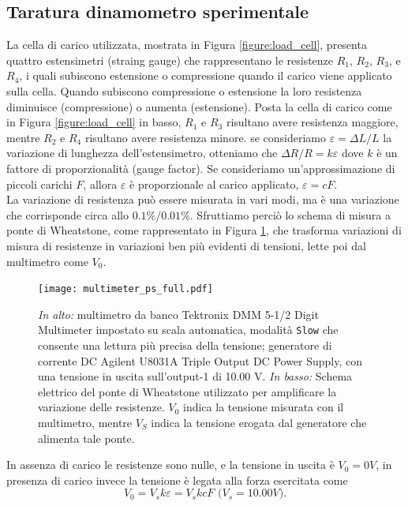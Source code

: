 \documentclass[italian, a4paper, 10pt, twocolumn]{../../style/lab_unige}
\newcommand{\reffig}[1]{Figura {\ref{#1}}}%
\begin{document}
    \subsection{Taratura dinamometro sperimentale}

    La cella di carico utilizzata, mostrata in \reffig{figure:load_cell}, presenta quattro estensimetri (straing gauge) che rappresentano le resistenze $R_1$, $R_2$, $R_3$, e $R_4$, i quali subiscono estensione o compressione quando il carico viene applicato sulla cella. Quando subiscono compressione o estensione la loro resistenza diminuisce (compressione) o aumenta (estensione). Posta la cella di carico come in \reffig{figure:load_cell} in basso, $R_1$ e $R_3$ risultano avere resistenza maggiore, mentre $R_2$ e $R_4$ risultano avere resistenza minore. se consideriamo $\varepsilon=\Delta L/L$ la variazione di lunghezza dell'estensimetro, otteniamo che $\Delta R/R = k\varepsilon$ dove $k$ è un fattore di proporzionalità (gauge factor). Se consideriamo un’approssimazione di piccoli carichi $F$, allora $\varepsilon$ è proporzionale al carico applicato, $\varepsilon=cF$.\\
    La variazione di resistenza può essere misurata in vari modi, ma è una variazione che corrisponde circa allo $0.1\%/0.01\%$. Sfruttiamo perciò lo schema di misura a ponte di Wheatstone, come rappresentato in \reffig{figure:multimeter_ps}, che trasforma variazioni di misura di resistenze in variazioni ben più evidenti di tensioni, lette poi dal multimetro come $V_0$.

    \begin{figure}
        \centering
        \texttt{[image: multimeter\_ps\_full.pdf]}
        \caption{\textit{In alto:} multimetro da banco Tektronix DMM 5-1/2 Digit Multimeter impostato su scala automatica, modalità \texttt{Slow} che consente una lettura più precisa della tensione; generatore di corrente DC Agilent U8031A Triple Output DC Power Supply, con una tensione in uscita sull'output-1 di 10.00 V. \textit{In basso:} Schema elettrico del ponte di Wheatstone utilizzato per amplificare la variazione delle resistenze. $V_0$ indica la tensione misurata con il multimetro, mentre $V_S$ indica la tensione erogata dal generatore che alimenta tale ponte.}
        \label{figure:multimeter_ps}
    \end{figure}

    In assenza di carico le resistenze sono nulle, e la tensione in uscita è $V_0=0V$, in presenza di carico invece la tensione è legata alla forza esercitata come
    \begin{equation}
        V_0=V_sk\varepsilon=V_skcF\text{ ($V_s=10.00V$).}\label{equation:v0_f}
    \end{equation}
    
\end{document}
